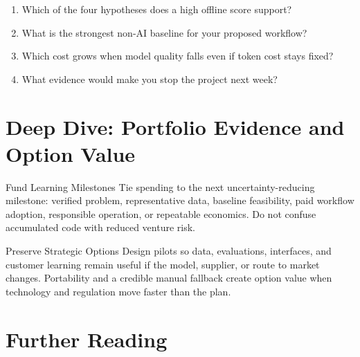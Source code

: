 \begin{checkpoint}
\begin{enumerate}
    \item Which of the four hypotheses does a high offline score support?
    \item What is the strongest non-AI baseline for your proposed workflow?
    \item Which cost grows when model quality falls even if token cost stays
          fixed?
    \item What evidence would make you stop the project next week?
\end{enumerate}
\end{checkpoint}

%
\section{Deep Dive: Portfolio Evidence and Option Value}
\begin{v3topic}{Fund Learning Milestones}
Tie spending to the next uncertainty-reducing milestone: verified problem,
representative data, baseline feasibility, paid workflow adoption, responsible
operation, or repeatable economics.
Do not confuse accumulated code with reduced venture risk.

\end{v3topic}
\begin{v3topic}{Preserve Strategic Options}
Design pilots so data, evaluations, interfaces, and customer learning remain
useful if the model, supplier, or route to market changes.
Portability and a credible manual fallback create option value when technology
and regulation move faster than the plan.
\end{v3topic}


\section{Further Reading}

